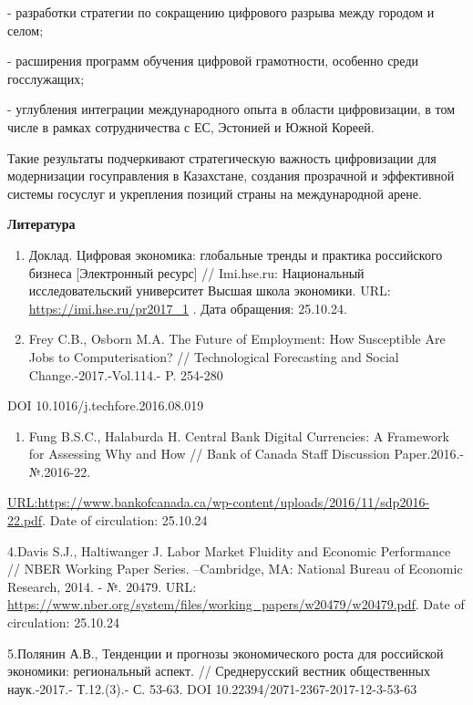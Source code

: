 {- разработки стратегии по сокращению цифрового разрыва между городом и
селом;

- расширения программ обучения цифровой грамотности, особенно среди
госслужащих;

- углубления интеграции международного опыта в области цифровизации, в
том числе в рамках сотрудничества с ЕС, Эстонией и Южной Кореей.

Такие результаты подчеркивают стратегическую важность цифровизации для
модернизации госуправления в Казахстане, создания прозрачной и
эффективной системы госуслуг и укрепления позиций страны на
международной арене.

{\bfseries Литература}

\begin{enumerate}
\def\labelenumi{\arabic{enumi}.}
\item
  Доклад. Цифровая экономика: глобальные тренды и практика российского
  бизнеса {[}Электронный ресурс{]} // Imi.hse.ru: Национальный
  исследовательский университет Высшая школа экономики. URL:
  \url{https://imi.hse.ru/pr2017_1} . Дата обращения: 25.10.24.
\item
  Frey C.B., Osborn M.A. The Future of Employment: How Susceptible Are
  Jobs to Computerisation? // Technological Forecasting and Social
  Change.-2017.-Vol.114.- P. 254-280
\end{enumerate}

DOI 10.1016/j.techfore.2016.08.019

\begin{enumerate}
\def\labelenumi{\arabic{enumi}.}
\setcounter{enumi}{2}
\item
  Fung B.S.C., Halaburda H. Central Bank Digital Currencies: A Framework
  for Assessing Why and How // Bank of Canada Staff Discussion
  Paper.2016.-№.2016-22.
\end{enumerate}

\href{url:https://www.bankofcanada.ca/wp-content/uploads/2016/11/sdp2016-22.pdf}{URL:https://www.bankofcanada.ca/wp-content/uploads/2016/11/sdp2016-22.pdf}.
Date of circulation: 25.10.24

4.Davis S.J., Haltiwanger J. Labor Market Fluidity and Economic
Performance // NBER Working Paper Series. --Cambridge, MA: National
Bureau of Economic Research, 2014. - №. 20479. URL:
\url{https://www.nber.org/system/files/working_papers/w20479/w20479.pdf}.
Date of circulation: 25.10.24

5.Полянин А.В., Тенденции и прогнозы экономического роста для российской
экономики: региональный аспект. // Среднерусский вестник общественных
наук.-2017.- Т.12.(3).- С. 53-63. DOI 10.22394/2071-2367-2017-12-3-53-63

}
